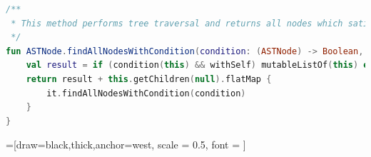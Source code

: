 \begin{enumerate}
\begin{lstlisting}[caption={Method for AST traversal}, label={lst:example1}, language=Kotlin]
/**
 * This method performs tree traversal and returns all nodes which satisfy the condition
 */
fun ASTNode.findAllNodesWithCondition(condition: (ASTNode) -> Boolean, withSelf: Boolean = true): List<ASTNode> {
    val result = if (condition(this) && withSelf) mutableListOf(this) else mutableListOf()
    return result + this.getChildren(null).flatMap {
        it.findAllNodesWithCondition(condition)
    }
}
\end{lstlisting}

=[draw=black,thick,anchor=west, scale = 0.5, font = \large]
\end{enumerate}
